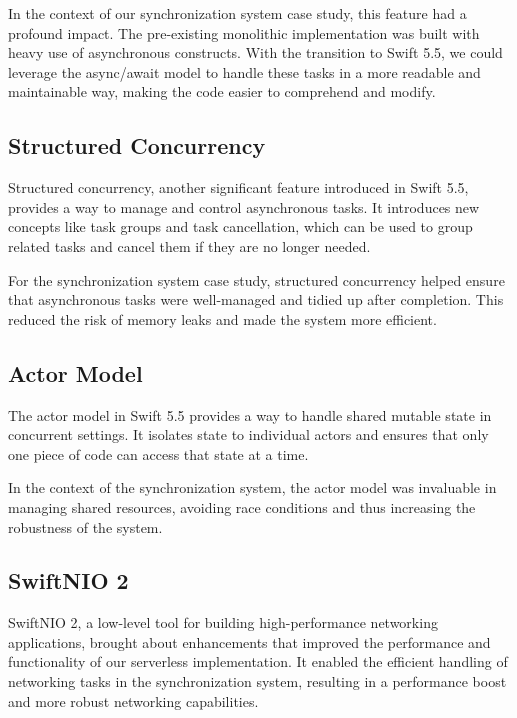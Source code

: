 In the context of our synchronization system case study, this feature had a profound impact. The pre-existing monolithic implementation was built with heavy use of asynchronous constructs. With the transition to Swift 5.5, we could leverage the async/await model to handle these tasks in a more readable and maintainable way, making the code easier to comprehend and modify.

\subsection{Structured Concurrency}
\label{subsec:StructuredConcurrency}

Structured concurrency, another significant feature introduced in Swift 5.5, provides a way to manage and control asynchronous tasks. It introduces new concepts like task groups and task cancellation, which can be used to group related tasks and cancel them if they are no longer needed.

For the synchronization system case study, structured concurrency helped ensure that asynchronous tasks were well-managed and tidied up after completion. This reduced the risk of memory leaks and made the system more efficient.

\subsection{Actor Model}
\label{subsec:ActorModel}

The actor model in Swift 5.5 provides a way to handle shared mutable state in concurrent settings. It isolates state to individual actors and ensures that only one piece of code can access that state at a time.

In the context of the synchronization system, the actor model was invaluable in managing shared resources, avoiding race conditions and thus increasing the robustness of the system.

\subsection{SwiftNIO 2}
\label{subsec:SwiftNIO}

SwiftNIO 2, a low-level tool for building high-performance networking applications, brought about enhancements that improved the performance and functionality of our serverless implementation. It enabled the efficient handling of networking tasks in the synchronization system, resulting in a performance boost and more robust networking capabilities.

